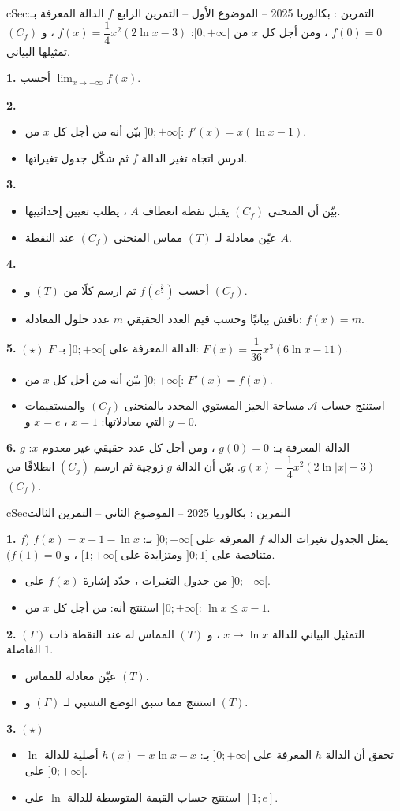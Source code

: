 \documentclass[12pt,a4paper]{article}
\newenvironment{BOX}[2]{\begin{otherlanguage}{english}\begin{arbox}{#1}{#2}}{\end{arbox}\end{otherlanguage}}
\newcounter{exo}
\newenvironment{tamrin}[1]{\stepcounter{exo}\begin{BOX}{cSec}{التمرين \theexo: #1}}{\end{BOX}}
\newenvironment{sq}{\begin{itemize}[leftmargin=2.4em,itemsep=3pt]}{\end{itemize}}
\newcommand{\qa}{\item[(أ)]}\newcommand{\qb}{\item[(ب)]}\newcommand{\qc}{\item[(جـ)]}\newcommand{\qd}{\item[(د)]}\newcommand{\qe}{\item[(هـ)]}
\newcommand{\QQ}[1]{\par\smallskip\textbf{#1.} }
\newcommand{\Lm}[1]{\displaystyle\lim_{x\to#1}}
\begin{document}
\begin{tamrin}{بكالوريا 2025 -- الموضوع الأول -- التمرين الرابع}
$f$ الدالة المعرفة بـ: $f(0)=0$ ، ومن أجل كل $x$ من $]0;+\infty[$: $f(x)=\dfrac14x^2(2\ln x-3)$ ، و $(C_f)$ تمثيلها البياني.
\QQ{1} أحسب $\Lm{+\infty}f(x)$.
\QQ{2}
\begin{sq}
\qa بيّن أنه من أجل كل $x$ من $]0;+\infty[$: $f'(x)=x(\ln x-1)$.
\qb ادرس اتجاه تغير الدالة $f$ ثم شكّل جدول تغيراتها.
\end{sq}
\QQ{3}
\begin{sq}
\qa بيّن أن المنحنى $(C_f)$ يقبل نقطة انعطاف $A$ ، يطلب تعيين إحداثييها.
\qb عيّن معادلة لـ $(T)$ مماس المنحنى $(C_f)$ عند النقطة $A$.
\end{sq}
\QQ{4}
\begin{sq}
\qa أحسب $f\left(e^{\frac32}\right)$ ثم ارسم كلًا من $(T)$ و $(C_f)$.
\qb ناقش بيانيًا وحسب قيم العدد الحقيقي $m$ عدد حلول المعادلة: $f(x)=m$.
\end{sq}
\QQ{5} $(\star)$ $F$ الدالة المعرفة على $]0;+\infty[$ بـ: $F(x)=\dfrac1{36}x^3(6\ln x-11)$.
\begin{sq}
\qa بيّن أنه من أجل كل $x$ من $]0;+\infty[$: $F'(x)=f(x)$.
\qb استنتج حساب $\mathcal A$ مساحة الحيز المستوي المحدد بالمنحنى $(C_f)$ والمستقيمات التي معادلاتها: $x=1$ ، $x=e$ و $y=0$.
\end{sq}
\QQ{6} $g$ الدالة المعرفة بـ: $g(0)=0$ ، ومن أجل كل عدد حقيقي غير معدوم $x$: $g(x)=\dfrac14x^2(2\ln|x|-3)$. بيّن أن الدالة $g$ زوجية ثم ارسم $(C_g)$ انطلاقًا من $(C_f)$.
\end{tamrin}

\begin{tamrin}{بكالوريا 2025 -- الموضوع الثاني -- التمرين الثالث}
\QQ{1} يمثل الجدول تغيرات الدالة $f$ المعرفة على $]0;+\infty[$ بـ: $f(x)=x-1-\ln x$ ($f$ متناقصة على $]0;1]$ ومتزايدة على $[1;+\infty[$ ، و $f(1)=0$).
\begin{sq}
\qa من جدول التغيرات ، حدّد إشارة $f(x)$ على $]0;+\infty[$.
\qb استنتج أنه: من أجل كل $x$ من $]0;+\infty[$: $\ln x\leqslant x-1$.
\end{sq}
\QQ{2} $(\Gamma)$ التمثيل البياني للدالة $x\mapsto\ln x$ ، و $(T)$ المماس له عند النقطة ذات الفاصلة $1$.
\begin{sq}
\qa عيّن معادلة للمماس $(T)$.
\qb استنتج مما سبق الوضع النسبي لـ $(\Gamma)$ و $(T)$.
\end{sq}
\QQ{3} $(\star)$
\begin{sq}
\qa تحقق أن الدالة $h$ المعرفة على $]0;+\infty[$ بـ: $h(x)=x\ln x-x$ أصلية للدالة $\ln$ على $]0;+\infty[$.
\qb استنتج حساب القيمة المتوسطة للدالة $\ln$ على $[1;e]$.
\end{sq}
\end{tamrin}
\end{document}
